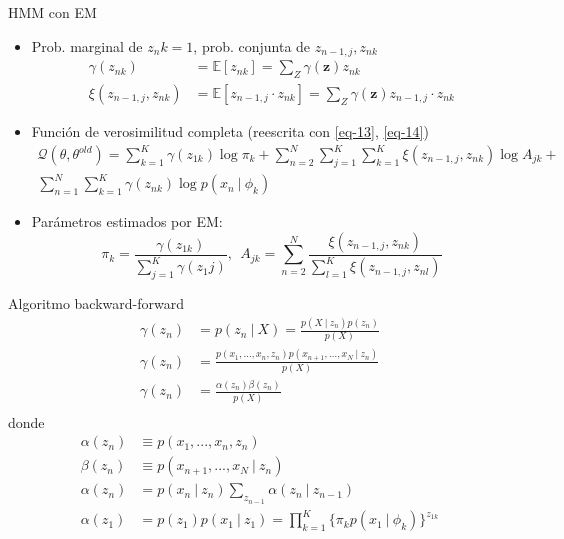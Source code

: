 \documentclass[10pt]{beamer}
\begin{document}
\begin{frame}{HMM con EM}
  \begin{itemize}
      \item Prob. marginal de $z_nk = 1$, prob. conjunta de $z_{n-1,j}, z_{nk}$
        \begin{align}
          \gamma(z_{nk}) &= \mathbb{E} \left[ z_{nk} \right] = \sum_Z  \gamma(\mathbf{z}) z_{nk} \label{eq-13} \\
          \xi(z_{n-1,j}, z_{nk}) &= \mathbb{E} \left[z_{n-1, j} \cdot z_{nk} \right] = 
            \sum_Z  \gamma(\mathbf{z}) z_{n-1, j} \cdot z_{nk} \label{eq-14}
        \end{align}  
        
        \item Función de verosimilitud completa (reescrita con \eqref{eq-13}, \eqref{eq-14})
          \begin{equation}
            \begin{split}
              \mathcal{Q}(\theta, \theta^{old}) = 
              \sum_{k=1}^K \gamma(z_{1k}) \log \pi_k + 
              \sum_{n=2}^N \sum_{j=1}^K \sum_{k=1}^K \xi(z_{n-1,j}, z_{nk}) \log A_{jk} + \\
              \sum_{n=1}^N \sum_{k=1}^K \gamma(z_{nk}) \log p(x_n ~|~ \phi_k)
            \end{split}
          \end{equation}
          
         \item Parámetros estimados por EM: 
         \begin{equation}
           \pi_k = \frac{\gamma(z_{1k})}{\sum_{j=1}^K \gamma(z_1j)}, ~~
           A_{jk} = \sum_{n=2}^N \frac{\xi(z_{n-1,j}, z_{nk})}{ \sum_{l=1}^K \xi(z_{n-1,j}, z_{nl})}
         \end{equation}
  \end{itemize}
\end{frame}

\begin{frame}{Algoritmo backward-forward}
  \begin{align}
  \gamma(z_n) &= p(z_n ~|~ X) = \frac{p(X ~|~ z_n) p(z_n)}{p(X)} \\
  \gamma(z_n) &= \frac{p(x_1, ..., x_n, z_n)p(x_{n+1}, ..., x_N ~|~ z_n)}{p(X)} \\
  \gamma(z_n) &= \frac{\alpha(z_n) \beta(z_n)}{p(X)} \\  
  \end{align}
  donde 
  \begin{align}
    \alpha(z_n) &\equiv p(x_1, ..., x_n, z_n) \\
    \beta(z_n) &\equiv p(x_{n+1}, ..., x_N ~|~ z_n)  \\
    \alpha(z_n) &= p(x_n ~|~ z_n) \sum_{z_{n-1}} \alpha(z_n ~|~ z_{n-1}) \\
    \alpha(z_1) &= p(z_1) p(x_1 ~|~ z_1) = \prod_{k=1}^K \lbrace {\pi_k p(x_1 ~|~ \phi_k)} \rbrace ^ {z_{1k}}
  \end{align}  
\end{frame}
\end{document}
